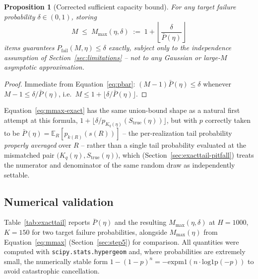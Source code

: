\documentclass[11pt]{article}
\newtheorem{proposition}{Proposition}
\begin{document}
\begin{proposition}[Corrected sufficient capacity bound]
\label{prop:corrected}
For any target failure probability $\delta \in (0,1)$, storing
\begin{equation}
M \;\le\; M_{\max}(\eta,\delta) \;:=\; 1 + \left\lfloor \frac{\delta}{\bar P(\eta)} \right\rfloor
\label{eq:mmax-exact}
\end{equation}
items guarantees $P_{\text{fail}}(M,\eta) \le \delta$ exactly, subject only to the independence
assumption of Section~\ref{sec:limitations} -- not to any Gaussian or large-$M$ asymptotic
approximation.
\end{proposition}

\begin{proof}
Immediate from Equation~\ref{eq:pbar}: $(M-1)\bar P(\eta) \le \delta$ whenever
$M - 1 \le \delta/\bar P(\eta)$, i.e.\ $M \le 1 + \lfloor \delta/\bar P(\eta) \rfloor$.
\end{proof}

Equation~\ref{eq:mmax-exact} has the same union-bound shape as a natural first attempt at this
formula, $1+\lfloor \delta/p_{K_q(\eta)}(S_{\text{true}}(\eta))\rfloor$, but with $p$ correctly
taken to be $\bar P(\eta) = \mathbb{E}_R[p_{k(R)}(s(R))]$ -- the per-realization tail probability
\emph{properly averaged} over $R$ -- rather than a single tail probability evaluated at the
mismatched pair $\big(K_q(\eta), S_{\text{true}}(\eta)\big)$, which (Section~\ref{sec:exacttail-pitfall})
treats the numerator and denominator of the same random draw as independently settable.

\subsection{Numerical validation}
\label{sec:exacttail-validation}

Table~\ref{tab:exacttail} reports $\bar P(\eta)$ and the resulting $M_{\max}(\eta,\delta)$ at
$H=1000$, $K=150$ for two target failure probabilities, alongside $M_{\max}(\eta)$ from
Equation~\ref{eq:mmax} (Section~\ref{sec:step5}) for comparison. All quantities were computed
with \texttt{scipy.stats.hypergeom} and, where probabilities are extremely small, the
numerically stable form $1-(1-p)^n = -\mathrm{expm1}(n\cdot\mathrm{log1p}(-p))$ to avoid
catastrophic cancellation.
\end{document}
